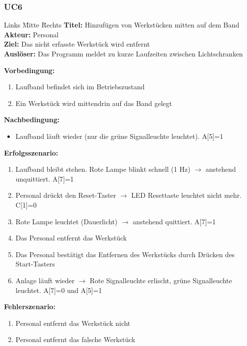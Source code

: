 \documentclass[oneside,a4paper,titlepage]{scrartcl} %
\begin{document}
\subsubsection{UC6}
\begin{tabbing}
 Links \= Mitte \= Rechts \kill
 \textbf{Titel:} \> \> Hinzufügen von Werkstücken mitten auf dem Band\\
 \textbf{Akteur:} \> \> Personal\\
 \textbf{Ziel:} \> \> Das nicht erfasste Werkstück wird entfernt\\
 \textbf{Auslöser:} \> \> Das Programm meldet zu kurze Laufzeiten zwischen Lichtschranken\\
\end{tabbing}
\textbf{Vorbedingung:}
\begin{enumerate}
 \item Laufband befindet sich im Betriebszustand
 \item Ein Werkstück wird mittendrin auf das Band gelegt
\end{enumerate}
\textbf{Nachbedingung:}
\begin{itemize}
 \item Laufband läuft wieder (nur die grüne Signalleuchte leuchtet). A[5]=1
\end{itemize}

\newpage

\textbf{Erfolgsszenario:}
\begin{enumerate}
 \item Laufband bleibt stehen. Rote Lampe blinkt schnell (1 Hz) $\rightarrow$ anstehend unquittiert. A[7]=1
 \item Personal drückt den Reset-Taster $\rightarrow$  LED Resettaste leuchtet nicht mehr. C[1]=0
 \item Rote Lampe leuchtet (Dauerlicht) $\rightarrow$  anstehend quittiert. A[7]=1
 \item Das Personal entfernt das Werkstück
 \item Das Personal bestätigt das Entfernen des Werkstücks durch Drücken des Start-Tasters
 \item Anlage läuft wieder $\rightarrow$  Rote Signalleuchte erlischt, grüne Signalleuchte leuchtet. A[7]=0 und A[5]=1
\end{enumerate}
\textbf{Fehlerszenario:}
\begin{enumerate}
    \item Personal entfernt das Werkstück nicht
    \item Personal entfernt das falsche Werkstück
\end{enumerate}
\end{document}
